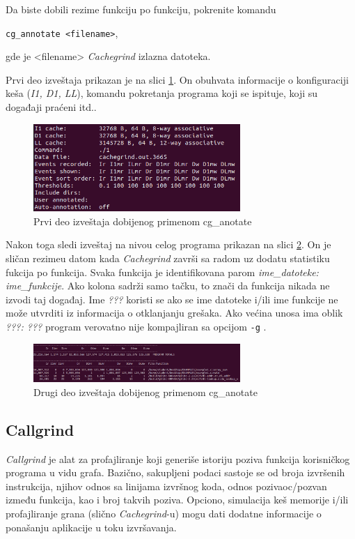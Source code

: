 \documentclass[12pt,oneside]{memoir}
\theoremstyle{plain}
\theoremstyle{definition}
\begin{document}
Da biste dobili rezime funkciju po funkciju, pokrenite komandu
\begin{center}
\texttt{cg\_annotate <filename>},
\end{center}
gde je <filename> \textit{Cachegrind} izlazna datoteka.

Prvi deo izveštaja prikazan je na slici \ref{fig:slika2.16}. On obuhvata informacije o konfiguraciji keša (\textit{I1, D1, LL}), komandu pokretanja programa koji se ispituje, koji su događaji praćeni itd.. 
\begin{figure}[!ht]
  \centering
  \includegraphics[width=0.7\textwidth]{CgAnotateFirst.png}
  \caption{Prvi deo izveštaja dobijenog primenom cg\_anotate}
  \label{fig:slika2.16}
\end{figure}

Nakon toga sledi izveštaj na nivou celog programa prikazan na slici \ref{fig:slika2.17}. On je sličan rezimeu datom kada \textit{Cachegrind} završi sa radom uz dodatu statistiku fukcija po funkcija. Svaka funkcija je identifikovana parom \textit{ime\_datoteke: ime\_funkcije}. Ako kolona sadrži samo tačku, to znači da funkcija nikada ne izvodi taj događaj. Ime \textit{???} koristi se ako se ime datoteke i/ili ime funkcije ne može utvrditi iz informacija o otklanjanju grešaka. Ako većina unosa ima oblik \textit{???: ???} program verovatno nije kompajliran sa opcijom \texttt{-g} \cite{Cachegrind}. 
\begin{figure}[!ht]
  \centering
  \includegraphics[width=0.7\textwidth]{CgAnotateSecond.png}
  \caption{Drugi deo izveštaja dobijenog primenom cg\_anotate}
  \label{fig:slika2.17}
\end{figure}

\subsection{Callgrind}
\textit{Callgrind} je alat za profajliranje koji generiše istoriju poziva funkcija korisničkog programa u vidu grafa. Bazično, sakupljeni podaci sastoje se od broja izvršenih instrukcija, njihov odnos sa linijama izvršnog koda, odnos pozivaoc/pozvan između funkcija, kao i broj takvih poziva. Opciono, simulacija keš memorije i/ili profajliranje grana (slično \textit{Cachegrind}-u) mogu dati dodatne informacije o ponašanju aplikacije u toku izvršavanja. 
\end{document}
